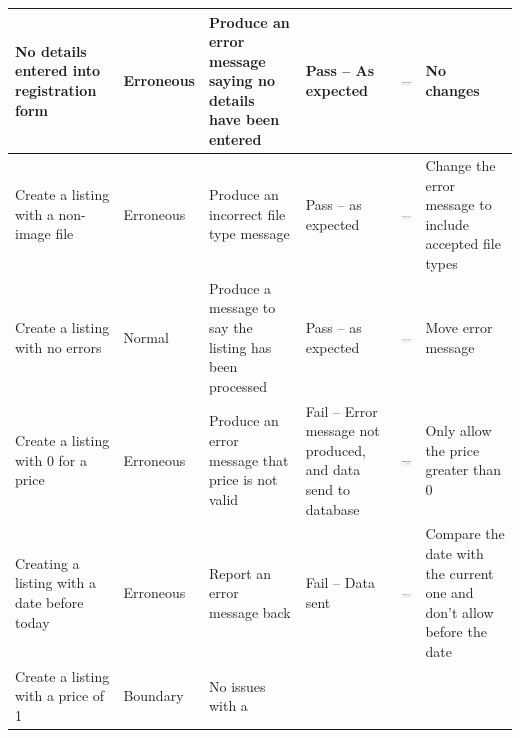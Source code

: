 \begin{center}
\begin{longtable}{|P{17mm}|P{17mm}|P{16mm}|P{17mm}|P{40mm}|P{21.5mm}|}
No details entered into registration form & Erroneous & Produce an error
message saying no details have been entered & Pass -- As expected &
\includegraphics[width=38mm]{ch3_developing/proto1/media/image5.png}
& No changes \\ \hline
Create a listing with a non-image file & Erroneous & Produce an
incorrect file type message & Pass -- as expected &
\includegraphics[width=38mm]{ch3_developing/proto1/media/image6.png}
& Change the error message to include accepted file types \\ \hline
Create a listing with no errors & Normal & Produce a message to say the
listing has been processed & Pass -- as expected &
\includegraphics[width=38mm]{ch3_developing/proto1/media/image7.png}
& Move error message \\ \hline
Create a listing with 0 for a price & Erroneous & Produce an error
message that price is not valid & Fail -- Error message not produced,
and data send to database &
\includegraphics[width=38mm]{ch3_developing/proto1/media/image7.png}
& Only allow the price greater than 0 \\ \hline
Creating a listing with a date before today & Erroneous & Report an
error message back & Fail -- Data sent &
\includegraphics[width=38mm]{ch3_developing/proto1/media/image7.png}
& Compare the date with the current one and don't allow before the
date \\ \hline
Create a listing with a price of 1 & Boundary & No issues with a

\end{longtable}
\end{center}
